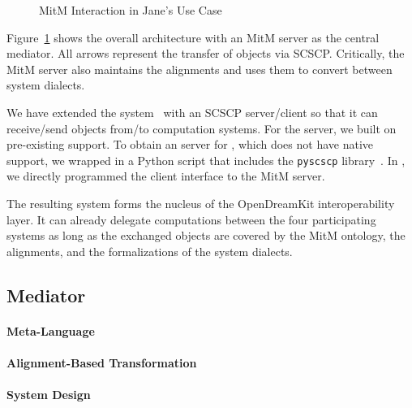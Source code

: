 \begin{figure}[ht]\centering\vspace*{-1em}
  \caption{MitM Interaction in Jane's Use Case}\label{fig:mitmpoc}\vspace*{-1em}
\end{figure}

Figure~\ref{fig:mitmpoc} shows the overall architecture with an MitM server as the central mediator.
All arrows represent the transfer of \OMMT objects via SCSCP.
Critically, the MitM server also maintains the alignments and uses them to convert between system dialects.

We have extended the \MMT system~\cite{Rabe:MAGMS13} with an SCSCP server/client so that it can receive/send objects from/to computation systems.
For the \GAP server, we built on pre-existing \SCSCP support.
To obtain an \SCSCP server for \Singular, which does not have native \SCSCP support, we wrapped \Singular in a Python script that includes the \lstinline|pyscscp| library~\cite{py-scscp:on}.
In \Sage, we directly programmed the client interface to the MitM server. 

The resulting system forms the nucleus of the OpenDreamKit interoperability layer. It can already delegate computations between the four participating systems as long as the exchanged objects are covered by the MitM ontology, the alignments, and the formalizations of the system dialects.

\subsection{Mediator}

\paragraph{Meta-Language}



\paragraph{Alignment-Based Transformation}


\paragraph{System Design}

